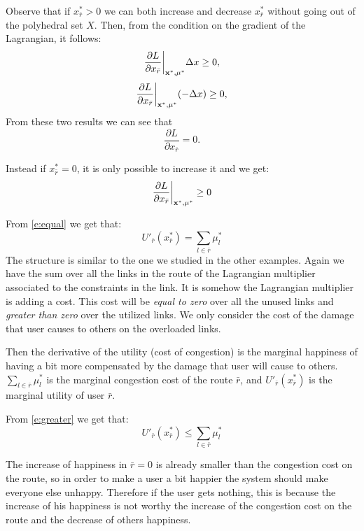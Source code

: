 Observe that if $x^*_{\bar r} > 0$ we can both increase and decrease $x^*_{\bar r}$ without going out of the polyhedral set $X$. Then, from the condition on the gradient of the Lagrangian, it follows:
$$ \frac{\partial L}{\partial x_{\bar r}}\bigg|_{\mathbf{x}^*, \mu^*} \Delta x \geq 0,$$
$$ \frac{\partial L}{\partial x_{\bar r}}\bigg|_{\mathbf{x}^*, \mu^*} (-\Delta x) \geq 0,$$
From these two results we can see that 
\begin{equation}
\label{e:equal}
\frac{\partial L}{\partial x_{\bar r}} =0.
\end{equation}

Instead if $x^*_{\bar r}=0$, it is only possible to increase it and we get:
\begin{equation}
\label{e:greater}
\frac{\partial L}{\partial x_{\bar r}}\bigg|_{\mathbf{x}^*, \mu^*} \ge 0
\end{equation}

From \eqref{e:equal}  we get that:
\begin{equation}
U'_{\bar{r}}(x^*_{\bar{r}})= \sum_{l \in {\bar r}} \mu^*_l
\end{equation}
The structure is similar to the one we studied in the other examples. Again we have the sum over all the links in the route of the Lagrangian multiplier associated to the constraints in the link. It is somehow the Lagrangian multiplier is adding a cost. This cost will be \textit{equal to zero} over all the unused links and \textit{greater than zero} over the utilized links.
We only consider the cost of the damage that user causes to others on the overloaded links.

Then the derivative of the utility (cost of congestion) is the marginal happiness of having a bit more compensated by the damage that user will cause to others. $\sum_{l \in {\bar r}} \mu^*_l$ is the marginal congestion cost of the route ${\bar r}$, and $U'_{\bar{r}}(x^*_{\bar{r}})$ is the marginal utility of user  ${\bar r}$.

From  \eqref{e:greater}  we get that:
\begin{equation}
U'_{\bar{r}}(x^*_{\bar{r}})\leq \sum_{l \in {\bar r}} \mu^*_l
\end{equation}

The increase of happiness in ${\bar r}=0$ is already smaller than the congestion cost on the route, so in order to make a user a bit happier the system should make everyone else unhappy. Therefore if the user gets nothing, this is because the increase of his happiness is not worthy the increase of the congestion cost on the route and the decrease of others happiness.

